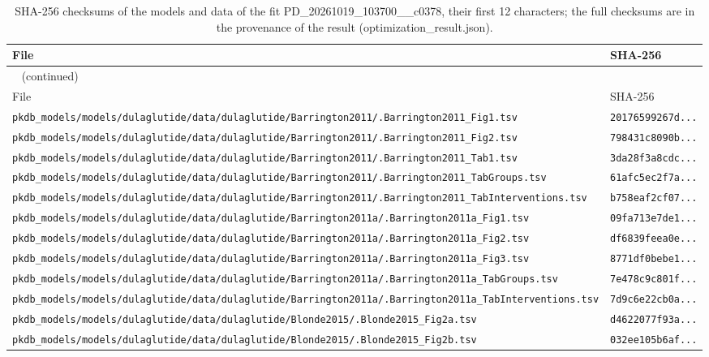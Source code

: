 \documentclass{article}
\begin{document}
\begin{longtable}{ll}
\caption{SHA-256 checksums of the models and data of the fit PD\_20261019\_103700\_\_c0378, their first 12 characters; the full checksums are in the provenance of the result (optimization\_result.json).}\label{tab:checksums:PD_20261019_103700__c0378} \\
\toprule
File & SHA-256 \\
\midrule
\endfirsthead
\multicolumn{2}{l}{\small\tablename~\thetable{} (continued)} \\
\toprule
File & SHA-256 \\
\midrule
\endhead
\bottomrule
\endlastfoot
\texttt{pkdb\_models/models/dulaglutide/data/dulaglutide/Barrington2011/.Barrington2011\_Fig1.tsv} & \texttt{20176599267d...} \\
\texttt{pkdb\_models/models/dulaglutide/data/dulaglutide/Barrington2011/.Barrington2011\_Fig2.tsv} & \texttt{798431c8090b...} \\
\texttt{pkdb\_models/models/dulaglutide/data/dulaglutide/Barrington2011/.Barrington2011\_Tab1.tsv} & \texttt{3da28f3a8cdc...} \\
\texttt{pkdb\_models/models/dulaglutide/data/dulaglutide/Barrington2011/.Barrington2011\_TabGroups.tsv} & \texttt{61afc5ec2f7a...} \\
\texttt{pkdb\_models/models/dulaglutide/data/dulaglutide/Barrington2011/.Barrington2011\_TabInterventions.tsv} & \texttt{b758eaf2cf07...} \\
\texttt{pkdb\_models/models/dulaglutide/data/dulaglutide/Barrington2011a/.Barrington2011a\_Fig1.tsv} & \texttt{09fa713e7de1...} \\
\texttt{pkdb\_models/models/dulaglutide/data/dulaglutide/Barrington2011a/.Barrington2011a\_Fig2.tsv} & \texttt{df6839feea0e...} \\
\texttt{pkdb\_models/models/dulaglutide/data/dulaglutide/Barrington2011a/.Barrington2011a\_Fig3.tsv} & \texttt{8771df0bebe1...} \\
\texttt{pkdb\_models/models/dulaglutide/data/dulaglutide/Barrington2011a/.Barrington2011a\_TabGroups.tsv} & \texttt{7e478c9c801f...} \\
\texttt{pkdb\_models/models/dulaglutide/data/dulaglutide/Barrington2011a/.Barrington2011a\_TabInterventions.tsv} & \texttt{7d9c6e22cb0a...} \\
\texttt{pkdb\_models/models/dulaglutide/data/dulaglutide/Blonde2015/.Blonde2015\_Fig2a.tsv} & \texttt{d4622077f93a...} \\
\texttt{pkdb\_models/models/dulaglutide/data/dulaglutide/Blonde2015/.Blonde2015\_Fig2b.tsv} & \texttt{032ee105b6af...} \\

\end{longtable}
\end{document}
